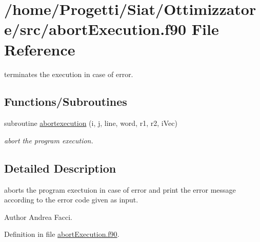 \hypertarget{abort_execution_8f90}{\section{/home/\-Progetti/\-Siat/\-Ottimizzatore/src/abort\-Execution.f90 File Reference}
\label{abort_execution_8f90}
}


terminates the execution in case of error.  


\subsection*{Functions/\-Subroutines}
\begin{DoxyCompactItemize}
\item 
subroutine \hyperlink{abort_execution_8f90_af9fd9adc11792b7ac163e6d936be8995}{abortexecution} (i, j, line, word, r1, r2, i\-Vec)
\begin{DoxyCompactList}\small\item\em abort the program execution. \end{DoxyCompactList}\end{DoxyCompactItemize}


\subsection{Detailed Description}
aborts the program exectuion in case of error and print the error message according to the error code given as input. \begin{DoxyAuthor}{Author}
Andrea Facci. 
\end{DoxyAuthor}


Definition in file \hyperlink{abort_execution_8f90_source}{abort\-Execution.\-f90}.



